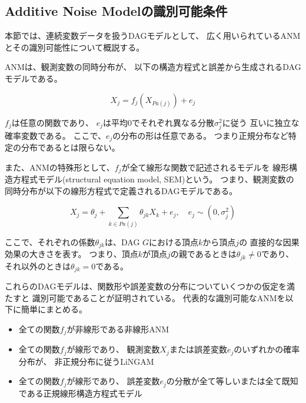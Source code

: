 
\subsection{Additive Noise Modelの識別可能条件}

本節では、連続変数データを扱うDAGモデルとして、
広く用いられているANM
\cite{Shimizu2006-yu}
\cite{Hoyer2008-oo}
\cite{Peters2013-eb}
\cite{Peters2014-ro}
\cite{Park2020-ey}
とその識別可能性について概説する。

ANMは、観測変数の同時分布が、
以下の構造方程式と誤差から生成されるDAGモデルである。

\begin{equation}
  X_j = f_j(X_{Pa(j)}) + e_j
  \label{def:ANM}
\end{equation}

$f_j$は任意の関数であり、
$e_j$は平均0でそれぞれ異なる分散$\sigma_j^2$に従う
互いに独立な確率変数である。
ここで、$e_j$の分布の形は任意である。
つまり正規分布など特定の分布であるとは限らない。

また、ANMの特殊形として、$f_j$が全て線形な関数で記述されるモデルを
線形構造方程式モデル(structural equation model, SEM)という。
つまり、観測変数の同時分布が以下の線形方程式で定義されるDAGモデルである。

\begin{equation}
  X_j = \theta_j + \sum_{k \in Pa(j)} \theta_{jk} X_k + e_j, \quad e_j \sim (0, \sigma_j^2)
\end{equation}

ここで、それぞれの係数$\theta_{jk}$は、DAG $G$における頂点$k$から頂点$j$の
直接的な因果効果の大きさを表す。
つまり、頂点$k$が頂点$j$の親であるときは$\theta_{jk} \neq 0$であり、
それ以外のときは$\theta_{jk}=0$である。

これらのDAGモデルは、関数形や誤差変数の分布についていくつかの仮定を満たすと
識別可能であることが証明されている。
代表的な識別可能なANMを以下に簡単にまとめる。

\begin{itemize}
  \item
  全ての関数$f_j$が非線形である非線形ANM\cite{Hoyer2008-oo}

  \item
  全ての関数$f_j$が線形であり、
  観測変数$X_j$または誤差変数$e_j$のいずれかの確率分布が、
  非正規分布に従うLiNGAM\cite{Shimizu2006-yu}

  \item
  全ての関数$f_j$が線形であり、
  誤差変数$e_j$の分散が全て等しいまたは全て既知である正規線形構造方程式モデル\cite{Peters2013-eb}
\end{itemize}

